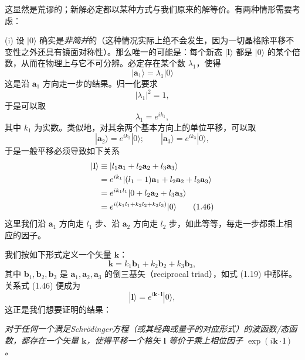 这显然是荒谬的；新解必定都以某种方式与我们原来的解等价。有两种情形需要考虑：

(i) 设 $|0\rangle$ 确实是\emph{非简并}的（这种情况实际上绝不会发生，因为一切晶格除平移不变性之外还具有镜面对称性）。那么唯一的可能是：每个新态 $|\mathbf{l}\rangle$ 都是 $|0\rangle$ 的某个倍数，从而在物理上与它不可分辨。必定存在某个数 $\lambda_1$，使得
\begin{equation*}
|\mathbf{a}_1\rangle=\lambda_1|0\rangle
\tag{1.42}
\end{equation*}
这是沿 $\mathbf{a}_1$ 方向走一步的结果。归一化要求
\begin{equation*}
|\lambda_1|^{2}=1,
\tag{1.43}
\end{equation*}
于是可以取
\begin{equation*}
\lambda_1=e^{ik_1},
\tag{1.44}
\end{equation*}
其中 $k_1$ 为实数。类似地，对其余两个基本方向上的单位平移，可以取
\begin{equation*}
|\mathbf{a}_2\rangle=e^{ik_2}|0\rangle;\qquad|\mathbf{a}_3\rangle=e^{ik_3}|0\rangle,
\tag{1.45}
\end{equation*}
于是一般平移必须导致如下关系
\begin{align*}
|\mathbf{l}\rangle&\equiv|l_1\mathbf{a}_1+l_2\mathbf{a}_2+l_3\mathbf{a}_3\rangle\notag\\
&=e^{ik_1}|(l_1-1)\mathbf{a}_1+l_2\mathbf{a}_2+l_3\mathbf{a}_3\rangle\notag\\
&=e^{ik_1 l_1}|0+l_2\mathbf{a}_2+l_3\mathbf{a}_3\rangle\notag\\
&=e^{i(k_1 l_1+k_2 l_2+k_3 l_3)}|0\rangle
\tag{1.46}
\end{align*}
这里我们沿 $\mathbf{a}_1$ 方向走 $l_1$ 步、沿 $\mathbf{a}_2$ 方向走 $l_2$ 步，如此等等，每走一步都乘上相应的因子。

我们按如下形式定义一个矢量 $\mathbf{k}$：
\begin{equation*}
\mathbf{k}=k_1\mathbf{b}_1+k_2\mathbf{b}_2+k_3\mathbf{b}_3,
\tag{1.47}
\end{equation*}
其中 $\mathbf{b}_1,\mathbf{b}_2,\mathbf{b}_3$ 是 $\mathbf{a}_1,\mathbf{a}_2,\mathbf{a}_3$ 的倒三基矢（reciprocal triad），如式 (1.19) 中那样。关系式 (1.46) 便成为
\begin{equation*}
|\mathbf{l}\rangle=e^{i\mathbf{k}\cdot\mathbf{l}}|0\rangle,
\tag{1.48}
\end{equation*}
这正是我们想要证明的结果：

\emph{对于任何一个满足Schrödinger方程（或其经典或量子的对应形式）的波函数/态函数，都存在一个矢量 $\mathbf{k}$，使得平移一个格矢 $\mathbf{l}$ 等价于乘上相位因子 $\exp(i\mathbf{k}\cdot\mathbf{l})$。}

